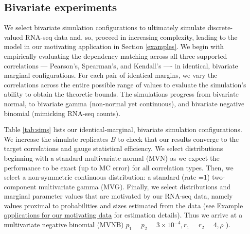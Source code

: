 \documentclass[]{article}
\begin{document}
\hypertarget{bivariate-experiments}{%
\subsection{Bivariate experiments}\label{bivariate-experiments}}

We select bivariate simulation configurations to ultimately simulate discrete-valued RNA-seq data and, so, proceed in increasing complexity, leading to the model in our motivating application in Section \ref{examples}.
We begin with empirically evaluating the dependency matching across all three supported correlations --- Pearson's, Spearman's, and Kendall's ---- in identical, bivariate marginal configurations.
For each pair of identical margins, we vary the correlations across the entire possible range of values to evaluate the simulation's ability to obtain the theoretic bounds.
The simulations progress from bivariate normal, to bivariate gamma (non-normal yet continuous), and bivariate negative binomial (mimicking RNA-seq counts).

Table \ref{tab:sims} lists our identical-marginal, bivariate simulation configurations.
We increase the simulate replicates \(B\) to check that our results converge to the target correlations and gauge statistical efficiency.
We select distributions beginning with a standard multivariate normal (MVN) as we expect the performance to be exact (up to MC error) for all correlation types.
Then, we select a non-symmetric continuous distribution: a standard (rate =1) two-component multivariate gamma (MVG).
Finally, we select distributions and marginal parameter values that are motivated by our RNA-seq data, namely values proximal to probabilities and sizes estimated from the data (see \href{examples}{Example applications for our motivating data} for estimation details).
Thus we arrive at a multivariate negative binomial (MVNB) \(p_1 = p_2 = \ensuremath{3\times 10^{-4}}, r_1 = r_2 = 4,\rho\) ).
\end{document}
